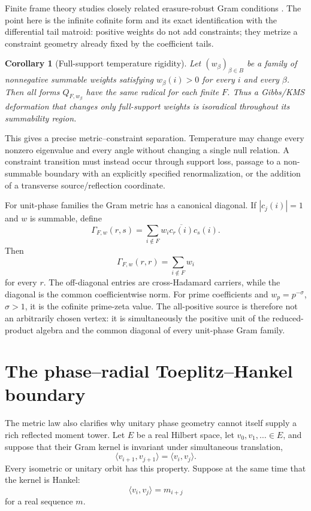 \documentclass[11pt]{article}
\newtheorem{corollary}[theorem]{Corollary}
\theoremstyle{definition}
\theoremstyle{remark}
\begin{document}
Finite frame theory studies closely related erasure-robust Gram conditions
\cite{AlexeevCahillMixon2012}.  The point here is the infinite cofinite form and its exact
identification with the differential tail matroid: positive weights do not add constraints;
they metrize a constraint geometry already fixed by the coefficient tails.

\begin{corollary}[Full-support temperature rigidity]
\label{cor:temperature-rigidity}
Let \((w_\beta)_{\beta\in B}\) be a family of nonnegative summable weights satisfying
\(w_\beta(i)>0\) for every \(i\) and every \(\beta\).  Then all forms
\(Q_{F,w_\beta}\) have the same radical for each finite \(F\).  Thus a Gibbs/KMS deformation
that changes only full-support weights is isoradical throughout its summability region.
\end{corollary}

This gives a precise metric--constraint separation.  Temperature may change every nonzero
eigenvalue and every angle without changing a single null relation.  A constraint transition
must instead occur through support loss, passage to a non-summable boundary with an explicitly
specified renormalization, or the addition of a transverse source/reflection coordinate.

For unit-phase families the Gram metric has a canonical diagonal.  If
\(|c_j(i)|=1\) and \(w\) is summable, define
\begin{equation}\label{eq:cross-hadamard}
  \Gamma_{F,w}(r,s)
  =\sum_{i\notin F}w_i\overline{c_r(i)}c_s(i).
\end{equation}
Then
\begin{equation}\label{eq:common-diagonal}
  \Gamma_{F,w}(r,r)=\sum_{i\notin F}w_i
\end{equation}
for every \(r\).  The off-diagonal entries are cross-Hadamard carriers, while the diagonal is
the common coefficientwise norm.  For prime coefficients and \(w_p=p^{-\sigma}\),
\(\sigma>1\), it is the cofinite prime-zeta value.  The all-positive source is therefore not
an arbitrarily chosen vertex: it is simultaneously the positive unit of the reduced-product
algebra and the common diagonal of every unit-phase Gram family.

\section{The phase--radial Toeplitz--Hankel boundary}
\label{sec:phase-radial}

The metric law also clarifies why unitary phase geometry cannot itself supply a rich reflected
moment tower.  Let \(E\) be a real Hilbert space, let \(v_0,v_1,\ldots\in E\), and suppose that
their Gram kernel is invariant under simultaneous translation,
\begin{equation}\label{eq:gram-shift}
  \langle v_{i+1},v_{j+1}\rangle=\langle v_i,v_j\rangle.
\end{equation}
Every isometric or unitary orbit has this property.  Suppose at the same time that the kernel is
Hankel:
\begin{equation}\label{eq:gram-hankel}
  \langle v_i,v_j\rangle=m_{i+j}
\end{equation}
for a real sequence \(m\).
\end{document}

